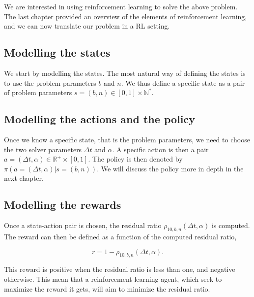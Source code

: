 \documentclass[
  letterpaper,
]{report}
\theoremstyle{plain}
\theoremstyle{definition}
\theoremstyle{definition}
\theoremstyle{remark}
\begin{document}
We are interested in using reinforcement learning to solve the above
problem. The last chapter provided an overview of the elements of
reinforcement learning, and we can now translate our problem in a RL
setting.

\hypertarget{modelling-the-states}{%
\subsection*{Modelling the states}\label{modelling-the-states}}

We start by modelling the states. The most natural way of defining the
states is to use the problem parameters \(b\) and \(n\). We thus define
a specific state as a pair of problem parameters
\(s = (b,n) \in [0,1]\times \mathbb{N^*}\).

\hypertarget{modelling-the-actions-and-the-policy}{%
\subsection*{Modelling the actions and the
policy}\label{modelling-the-actions-and-the-policy}}

Once we know a specific state, that is the problem parameters, we need
to choose the two solver parameters \(\Delta t\) and \(\alpha\). A
specific action is then a pair
\(a = (\Delta t, \alpha) \in \mathbb{R^+}\times [0,1]\). The policy is
then denoted by \(\pi(a = (\Delta t, \alpha) |s = (b,n))\). We will
discuss the policy more in depth in the next chapter.

\hypertarget{modelling-the-rewards}{%
\subsection*{Modelling the rewards}\label{modelling-the-rewards}}

Once a state-action pair is chosen, the residual ratio
\(\rho_{10,b,n}(\Delta t, \alpha)\) is computed. The reward can then be
defined as a function of the computed residual ratio,

\[
r = 1 - \rho_{10,b,n}(\Delta t, \alpha).
\]

This reward is positive when the residual ratio is less than one, and
negative otherwise. This mean that a reinforcement learning agent, which
seek to maximize the reward it gets, will aim to minimize the residual
ratio.
\end{document}
